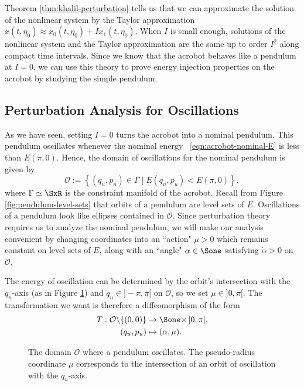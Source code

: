 Theorem \ref{thm:khalil-perturbation} tells us that we can approximate the
solution of the nonlinear system by the Taylor approximation 
\(x(t,\eta_0) \approx x_0(t,\eta_0) + I x_1(t,\eta_0)\).
When \(I\) is small enough, solutions of the nonlinear system and
the Taylor approximation are the same up to order \(I^2\) along compact time
intervals.
Since we know that the acrobot behaves like a pendulum at \(I = 0\), we can
use this theory to prove energy injection properties on the acrobot by studying
the simple pendulum.
 
\subsection*{Perturbation Analysis for Oscillations}
As we have seen, setting \(I = 0\) turns the acrobot into a nominal pendulum. 
This pendulum oscillates whenever the nominal energy
~\eqref{eqn:acrobot-nominal-E} is less than \(E(\pi,0)\). 
Hence, the domain of oscillations for the nominal pendulum is given by
\[
    \mathcal{O} := \left\{ (q_u,p_u) \in \Gamma \mid E(q_u,p_u) < E(\pi,0)\right\}
    ,
\]
where \(\Gamma \simeq \SxR\) is the constraint manifold of the
acrobot.
Recall from Figure \ref{fig:pendulum-level-sets} that orbits of a pendulum 
are level sets of \(E\). 
Oscillations of a pendulum look like ellipses contained in \(\mathcal{O}\).
Since perturbation theory requires us to analyze the nominal pendulum, we will
make our analysis convenient by changing coordinates into an
``action" \(\mu > 0\) which remains constant on level sets of \(E\), 
along with an ``angle" \(\alpha \in \Sone\) satisfying \(\dot{\alpha} > 0\) on
\(\mathcal{O}\).

The energy of oscillation can be determined by the orbit's intersection
with the \(q_u\)-axis (as in Figure \ref{fig:mu-intersection}) 
and \(q_u \in ]-\pi,\pi[\) on \(\mathcal{O}\), so we set \(\mu \in ]0,\pi[\).
The transformation we want is therefore a diffeomorphism of the form
\begin{align*}
    T : \mathcal{O} \backslash \{(0,0)\} &\rightarrow \Sone \times \, ]0,\pi[, \\
    (q_u, p_u) &\mapsto (\alpha,\mu)
    .
\end{align*}

\begin{figure}
    \centering
    \caption{The domain \(\mathcal{O}\) where a pendulum oscillates.
    The pseudo-radius coordinate \(\mu\) corresponds to the
    intersection of an orbit of oscillation with the \(q_u\)-axis.}
    \label{fig:mu-intersection}
\end{figure}

